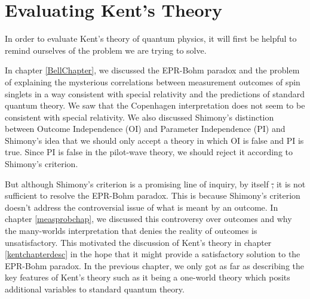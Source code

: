 \documentclass[12pt]{report}
\providecommand{\DIFdel}[1]{{\protect\color{red}\sout{#1}}}                      %
\providecommand{\DIFaddbegin}{} %
\providecommand{\DIFaddend}{} %
\providecommand{\DIFdelbegin}{} %
\providecommand{\DIFdelend}{} %
\begin{document}

\DIFdelbegin %

\DIFdelend %
\DIFaddbegin \newpage 
\DIFaddend %
\DIFaddbegin 

\DIFaddend \chapter{Evaluating Kent's Theory\label{KentEval}}
In order to evaluate Kent's theory of quantum physics, it will first be helpful to remind ourselves of the problem we are trying to solve. 

In chapter \ref{BellChapter}, we discussed the EPR-Bohm paradox and the problem of explaining  the mysterious correlations between measurement outcomes of spin singlets in a way consistent with special relativity and the predictions of standard quantum theory. We saw that the Copenhagen interpretation does not seem to be consistent with special relativity. We also discussed Shimony's distinction between Outcome Independence (OI) and Parameter Independence (PI) and Shimony's idea that we should only accept a theory in which OI is false and PI is true. Since PI is false in the pilot-wave theory, we should reject it according to Shimony's criterion.  

But although Shimony's criterion is a promising line of inquiry, by itself \DIFdelbegin \DIFdel{, }\DIFdelend it is not sufficient to resolve the  EPR-Bohm paradox. This is because Shimony's criterion doesn't address the controversial issue of what is meant by an outcome. In chapter \ref{measprobchap}, we discussed this controversy over outcomes and why the many-worlds interpretation that denies the reality of outcomes is unsatisfactory. This motivated the discussion of Kent's theory in chapter \ref{kentchapterdesc} in the hope that it might provide a satisfactory solution to the EPR-Bohm paradox. In the previous chapter, we only got as far as describing the key features of Kent's theory such as it being a one-world theory which posits additional variables to standard quantum theory. 
\end{document}
